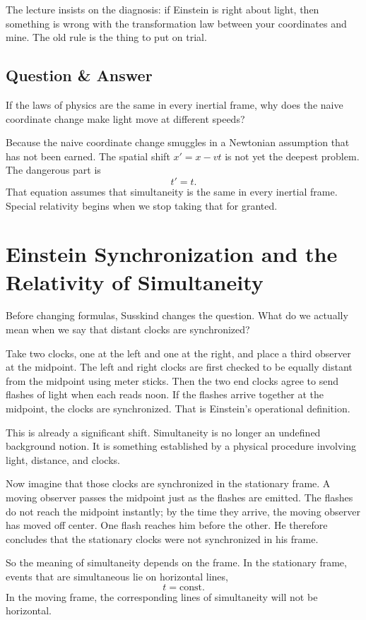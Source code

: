 The lecture insists on the diagnosis: if Einstein is right about light, then something is wrong with the transformation law between your coordinates and mine. The old rule is the thing to put on trial.

\subsection{Question \& Answer}

If the laws of physics are the same in every inertial frame, why does the naive coordinate change make light move at different speeds?

Because the naive coordinate change smuggles in a Newtonian assumption that has not been earned. The spatial shift \(x'=x-vt\) is not yet the deepest problem. The dangerous part is
\[
t'=t.
\]
That equation assumes that simultaneity is the same in every inertial frame. Special relativity begins when we stop taking that for granted.

\section{Einstein Synchronization and the Relativity of Simultaneity}

Before changing formulas, Susskind changes the question. What do we actually mean when we say that distant clocks are synchronized?

Take two clocks, one at the left and one at the right, and place a third observer at the midpoint. The left and right clocks are first checked to be equally distant from the midpoint using meter sticks. Then the two end clocks agree to send flashes of light when each reads noon. If the flashes arrive together at the midpoint, the clocks are synchronized. That is Einstein's operational definition.

This is already a significant shift. Simultaneity is no longer an undefined background notion. It is something established by a physical procedure involving light, distance, and clocks.

Now imagine that those clocks are synchronized in the stationary frame. A moving observer passes the midpoint just as the flashes are emitted. The flashes do not reach the midpoint instantly; by the time they arrive, the moving observer has moved off center. One flash reaches him before the other. He therefore concludes that the stationary clocks were not synchronized in his frame.

So the meaning of simultaneity depends on the frame. In the stationary frame, events that are simultaneous lie on horizontal lines,
\begin{equation}
t=\text{const}.
\end{equation}
In the moving frame, the corresponding lines of simultaneity will not be horizontal.

